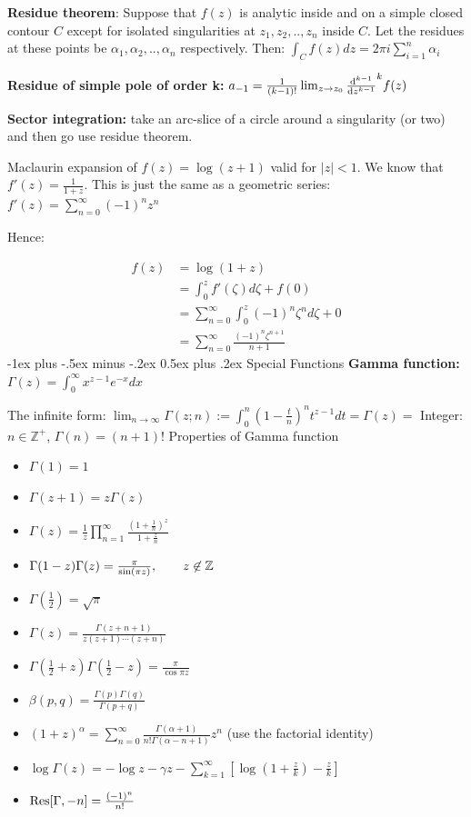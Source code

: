 \documentclass{article}
\makeatletter
\theoremstyle{definition}
\renewcommand{\section}{\@startsection{section}{1}{0mm}%
	{-1ex plus -.5ex minus -.2ex}%
	{0.5ex plus .2ex}%
	{\normalfont\large\bfseries}}
\makeatother
\begin{document}
\begin{multicols}{3}
\textbf{Residue theorem}: Suppose that $f(z)$ is analytic inside and on a simple closed contour $C$ except for isolated singularities at $z_1, z_2,..,z_n$ inside $C$. Let the residues at these points be $\alpha_1, \alpha_2,..,\alpha_n$ respectively. Then:
$\int_C f(z) dz = 2 \pi i \sum_{i=1}^n \alpha_i$

\textbf{Residue of simple pole of order k:} $a_{-1} = \frac{1}{(k-1)!} \lim_{z \to z_0} \dv{{}^{k-1}}{z^{k-1}} (z-z_0)^k f(z)$ 

\textbf{Sector integration: }take an arc-slice of a circle around a singularity (or two) and then go use residue theorem.

Maclaurin expansion of $f(z) = \log(z+1)$ valid for $|z|<1$. We know that $f'(z) = \frac{1}{1+z}$. This is just the same as a geometric series: $f'(z) = \sum_{n=0}^\infty (-1)^n z^n$

Hence:

\begin{align}
f(z) &= \log(1+z) \\ 
& = \int_{0}^z f'(\zeta) d\zeta + f(0) \\ 
& = \sum_{n=0}^\infty \int_{0}^z (-1)^n\zeta^n d\zeta + 0 \\ 
&  = \sum_{n=0}^\infty \frac{(-1)^n\zeta^{n+1}}{n+1}  
\end{align}
\section{Special Functions}
\textbf{Gamma function:} $\Gamma(z) = \int_0^\infty x^{z-1} e^{-x} dx$

The infinite form:
$\lim_{n\to\infty} \Gamma(z;n) := \int_{0}^{n} (1-\frac{t}{n})^n t^{z-1} dt = \Gamma(z) =  $
Integer: $n \in \mathbb{Z}^+$, $\Gamma(n) = (n+1)!$ 
Properties of Gamma function
\begin{itemize}
	\item $\Gamma(1) = 1$
	\item $\Gamma(z+1) = z \Gamma(z)$ 
	\item $\Gamma (z)={\frac {1}{z}}\prod _{n=1}^{\infty }{\frac {\left(1+{\frac {1}{n}}\right)^{z}}{1+{\frac {z}{n}}}}$
	\item $\Gamma (1-z)\Gamma (z)={\pi  \over \sin(\pi z)},\qquad z\not \in \mathbb{Z} $
	\item $\Gamma(\frac{1}{2}) = \sqrt{\pi }$
	\item $ \Gamma (z)={\frac {\Gamma (z+n+1)}{z(z+1)\cdots (z+n)}}$
	\item $\Gamma(\frac{1}{2} + z) \Gamma(\frac{1}{2} - z) = \frac{\pi}{\cos \pi z}$ 
	\item $\beta(p,q) = \frac{\Gamma(p)\Gamma(q)}{\Gamma(p+q)}$
	\item $(1+z)^\alpha = \sum_{n=0}^\infty \frac{\Gamma(\alpha+1)}{n!\Gamma(\alpha-n+1)}z^n$ (use the factorial identity)
	\item $\log \Gamma(z) = -\log z - \gamma z - \sum_{k=1}^\infty \left[\log(1+\frac{z}{k}) - \frac{z}{k}\right]$
	\item $\Res[\Gamma, -n] = \frac{(-1)^n}{n!}$
\end{itemize}


\end{multicols}
\end{document}
